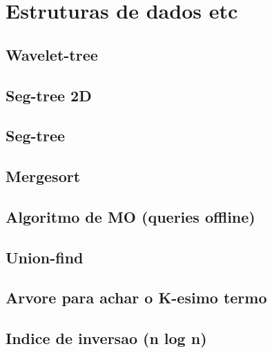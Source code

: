 \section{Estruturas de dados etc}
\subsection{Wavelet-tree}
\raggedbottom
\hrulefill
\subsection{Seg-tree 2D}
\raggedbottom
\hrulefill
\subsection{Seg-tree}
\raggedbottom
\hrulefill
\subsection{Mergesort}
\raggedbottom
\hrulefill
\subsection{Algoritmo de MO (queries offline)}
\raggedbottom
\hrulefill
\subsection{Union-find}
\raggedbottom
\hrulefill
\subsection{Arvore para achar o K-esimo termo}
\raggedbottom
\hrulefill
\subsection{Indice de inversao (n log n)}
\raggedbottom
\hrulefill
\clearpage

